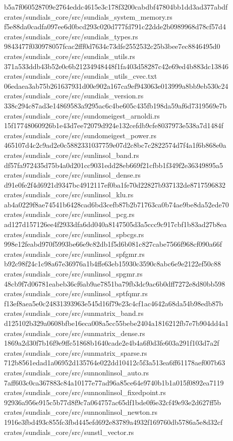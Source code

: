 \documentclass[
  10pt,
]{article}
\newenvironment{Shaded}{}{}
\newcommand{\NormalTok}[1]{#1}
\begin{document}
\begin{Shaded}
\begin{Highlighting}[]
\NormalTok{b5a7f060528709e2764eddc4615e3c178f3200cabdbf47804bb1dd3ad377abdf  crates/sundials\_core/src/sundials\_system\_memory.rs}
\NormalTok{f5e88da0cadfa097ee6d0bcd293c020d777fd791c22dde2b0989968d78cf57d4  crates/sundials\_core/src/sundials\_types.rs}
\NormalTok{9843477f030978057fcac2fff0d7634c73dfe2552532c25b3bee7ec8846495d0  crates/sundials\_core/src/sundials\_utils.rs}
\NormalTok{371a533ddb43b52e0c6b21234948448f1fa403d58287c42e69ed4b883dc13846  crates/sundials\_core/src/sundials\_utils\_cvec.txt}
\NormalTok{06edaea3ab75b261637931d00e902a167ca9ef943063e013999a8bb9eb530c24  crates/sundials\_core/src/sundials\_version.rs}
\NormalTok{338c294c87ad3e14869583a9295ac6c4be605c435fb198da59af6d7319569e7b  crates/sundials\_core/src/sundomeigest\_arnoldi.rs}
\NormalTok{15f17748060926b1e43d7ee72079d924e132cefdb9cfe8037973e538a7d1484f  crates/sundials\_core/src/sundomeigest\_power.rs}
\NormalTok{465107d4c2c9ad2e0c5882331037759e07d2c8bc7c2822574d7f4a1f6b868e0a  crates/sundials\_core/src/sunlinsol\_band.rs}
\NormalTok{df57fa972435d75b4a0d201cc9031edd28eb669f21cfbb1f349f2e36349895a5  crates/sundials\_core/src/sunlinsol\_dense.rs}
\NormalTok{d91e0fe2f4d6921d9347bc4912117ef0ba1fe70d22827b937132de8717596832  crates/sundials\_core/src/sunlinsol\_klu.rs}
\NormalTok{ab4a0229f8ae74541b6428cad6bd3cefb87b2b71763ca0b74ae9be8da52ede70  crates/sundials\_core/src/sunlinsol\_pcg.rs}
\NormalTok{ad127d157126ee4f2933dfa6dd040a8147505d3a5ccc9c917cbf1b83ad27b8ea  crates/sundials\_core/src/sunlinsol\_spbcgs.rs}
\NormalTok{998e12feabd970f5993be66e9c82db1f5d6b081c827cabe7566f968cf090a66f  crates/sundials\_core/src/sunlinsol\_spfgmr.rs}
\NormalTok{b92c98f24c1c98a67e36976a1b4ffe63eb15930c3590c8abc6e9e2122ef50c88  crates/sundials\_core/src/sunlinsol\_spgmr.rs}
\NormalTok{48cb9f7d06781eabeb36cf6ab9ae7851ba79fb3dc9ac6b0dff7272e8d80bb598  crates/sundials\_core/src/sunlinsol\_sptfqmr.rs}
\NormalTok{f13ef8aea5e0c24831393963e545d16f79e23c4cf1ac4642a68da54b98edb87b  crates/sundials\_core/src/sunmatrix\_band.rs}
\NormalTok{d125102b329a0608bfbe16eca008a5cc55bebe2404a1816212fb7e7b904dd4a1  crates/sundials\_core/src/sunmatrix\_dense.rs}
\NormalTok{1869a2d30f7b16f9e9ffc51868b1640cade2e4b4a6f0d3fe603a291f103d7a2f  crates/sundials\_core/src/sunmatrix\_sparse.rs}
\NormalTok{712b8561edad1a06952d135764e022dd10412c5f3a513ea6ff61178aef007b63  crates/sundials\_core/src/sunnonlinsol\_auto.rs}
\NormalTok{7aff603c0ca367883c84a10177e77ad96a85ce64e9740b1b1a015f0892ea7119  crates/sundials\_core/src/sunnonlinsol\_fixedpoint.rs}
\NormalTok{92936a956e915c5b77d8f9c7a064757ac65df1bde0f6e32cf49e93e2d627ff5b  crates/sundials\_core/src/sunnonlinsol\_newton.rs}
\NormalTok{1916e3fbd493c855fc3fbd445efd692e83789a4932f169760db5786a5e8d32cf  crates/sundials\_core/src/sunstl\_vector.rs}
\end{Highlighting}
\end{Shaded}
\end{document}
